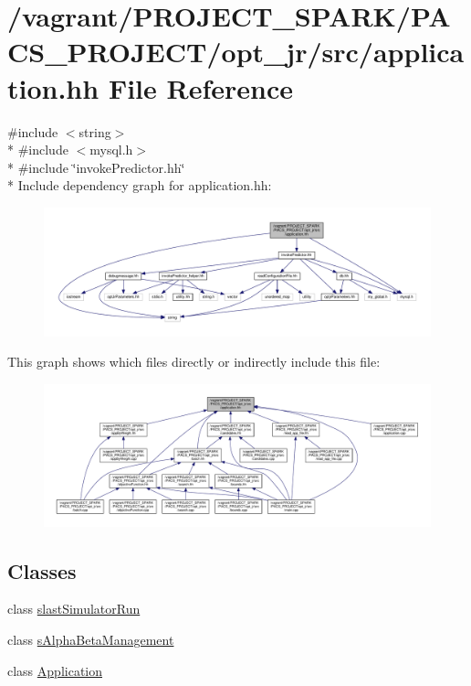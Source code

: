 \hypertarget{application_8hh}{\section{/vagrant/\-P\-R\-O\-J\-E\-C\-T\-\_\-\-S\-P\-A\-R\-K/\-P\-A\-C\-S\-\_\-\-P\-R\-O\-J\-E\-C\-T/opt\-\_\-jr/src/application.hh File Reference}
\label{application_8hh}
}
{\ttfamily \#include $<$string$>$}\\*
{\ttfamily \#include $<$mysql.\-h$>$}\\*
{\ttfamily \#include \char`\"{}invoke\-Predictor.\-hh\char`\"{}}\\*
Include dependency graph for application.\-hh\-:\nopagebreak
\begin{figure}[H]
\begin{center}
\leavevmode
\includegraphics[width=350pt]{application_8hh__incl}
\end{center}
\end{figure}
This graph shows which files directly or indirectly include this file\-:\nopagebreak
\begin{figure}[H]
\begin{center}
\leavevmode
\includegraphics[width=350pt]{application_8hh__dep__incl}
\end{center}
\end{figure}
\subsection*{Classes}
\begin{DoxyCompactItemize}
\item 
class \hyperlink{classslastSimulatorRun}{slast\-Simulator\-Run}
\item 
class \hyperlink{classsAlphaBetaManagement}{s\-Alpha\-Beta\-Management}
\item 
class \hyperlink{classApplication}{Application}
\end{DoxyCompactItemize}
